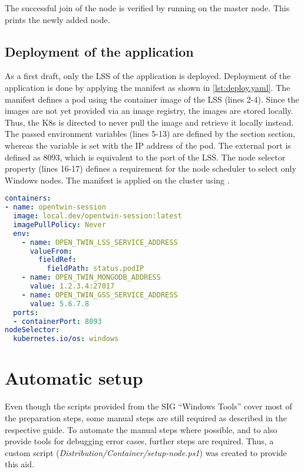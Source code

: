 The successful join of the node is verified by running  on the master node. This prints the newly added node.

\vspace{-.5em}
\subsection{Deployment of the application}\vspace{-.5em}
As a first draft, only the \ac{LSS} of the application is deployed. 
Deployment of the application is done by applying the manifest as shown in \autoref{lst:deploy.yaml}.
The manifest defines a pod using the container image of the \ac{LSS} (lines 2-4). Since the images are not yet provided via an image registry, the images are stored locally. Thus, the \ac{K8s} is directed to never pull the image and retrieve it locally instead.
The passed environment variables (lines 5-13) are defined by the section  section, whereas the variable  is set with the \ac{IP} address of the pod. The external port is defined as 8093, which is equivalent to the port of the \ac{LSS}.
The node selector property (lines 16-17) defines a requirement for the node scheduler to select only \ac{Windows} nodes.
The manifest is applied on the cluster using .
\begin{lstlisting}[label=lst:deploy.yaml, caption={Partial section of configuration for cluster deployment of the \ac{LSS} (\textit{Distribution/Kubernetes/open\_twin.yaml})}, language=yaml]
containers:
- name: opentwin-session
  image: local.dev/opentwin-session:latest
  imagePullPolicy: Never
  env:
    - name: OPEN_TWIN_LSS_SERVICE_ADDRESS
      valueFrom:
        fieldRef:
          fieldPath: status.podIP
    - name: OPEN_TWIN_MONGODB_ADDRESS
      value: 1.2.3.4:27017
    - name: OPEN_TWIN_GSS_SERVICE_ADDRESS
      value: 5.6.7.8
  ports:
  - containerPort: 8093
nodeSelector:
  kubernetes.io/os: windows
\end{lstlisting}


\section{Automatic setup}
Even though the scripts provided from the \ac{SIG} \enquote{Windows Tools} cover most of the preparation steps, some manual steps are still required as described in the respective guide\cite{GitHubKubernetesSIGWindowsTools.20230213}. To automate the manual steps where possible, and to also provide tools for debugging error cases, further steps are required. Thus, a custom script (\textit{Distribution/Container/setup-node.ps1}) was created to provide this aid.


